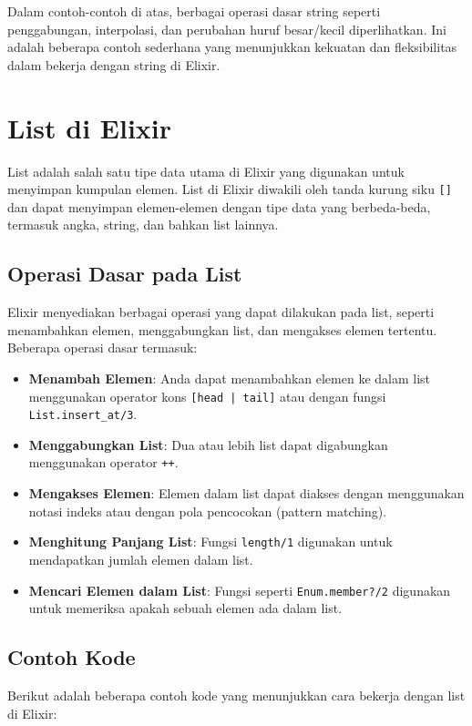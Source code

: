 Dalam contoh-contoh di atas, berbagai operasi dasar string seperti penggabungan, interpolasi, dan perubahan huruf besar/kecil diperlihatkan. Ini adalah beberapa contoh sederhana yang menunjukkan kekuatan dan fleksibilitas dalam bekerja dengan string di Elixir.

\section{List di Elixir}

List adalah salah satu tipe data utama di Elixir yang digunakan untuk menyimpan kumpulan elemen. List di Elixir diwakili oleh tanda kurung siku \texttt{[]} dan dapat menyimpan elemen-elemen dengan tipe data yang berbeda-beda, termasuk angka, string, dan bahkan list lainnya.

\subsection{Operasi Dasar pada List}

Elixir menyediakan berbagai operasi yang dapat dilakukan pada list, seperti menambahkan elemen, menggabungkan list, dan mengakses elemen tertentu. Beberapa operasi dasar termasuk:

\begin{itemize}
	\item \textbf{Menambah Elemen}: Anda dapat menambahkan elemen ke dalam list menggunakan operator kons \texttt{[head | tail]} atau dengan fungsi \texttt{List.insert\_at/3}.
	\item \textbf{Menggabungkan List}: Dua atau lebih list dapat digabungkan menggunakan operator \texttt{++}.
	\item \textbf{Mengakses Elemen}: Elemen dalam list dapat diakses dengan menggunakan notasi indeks atau dengan pola pencocokan (pattern matching).
	\item \textbf{Menghitung Panjang List}: Fungsi \texttt{length/1} digunakan untuk mendapatkan jumlah elemen dalam list.
	\item \textbf{Mencari Elemen dalam List}: Fungsi seperti \texttt{Enum.member?/2} digunakan untuk memeriksa apakah sebuah elemen ada dalam list.
\end{itemize}

\subsection{Contoh Kode}

Berikut adalah beberapa contoh kode yang menunjukkan cara bekerja dengan list di Elixir:

